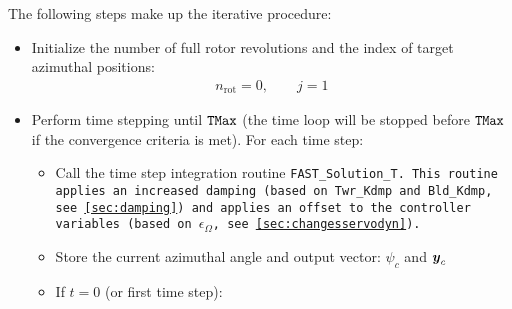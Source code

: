 \documentclass[11pt]{article}
\begin{document}
The following steps make up the iterative procedure:
\begin{itemize}\tightlist
    \item Initialize the number of full rotor revolutions and the index of target azimuthal positions:
        \begin{align}
            n_\text{rot} = 0
         , \qquad
         j = 1
        \end{align}
    \item Perform time stepping until $\tt{TMax}$ (the time loop will be stopped before $\tt{TMax}$ if the convergence criteria is met).
      For each time step:
        \begin{itemize}\tightlist
            \item Call the time step integration routine \tt{FAST\_Solution\_T}. This routine applies an increased damping (based on \tt{Twr\_Kdmp} and \tt{Bld\_Kdmp}, see \autoref{sec:damping}) and applies an offset to the controller variables (based on $\epsilon_\Omega$, see \autoref{sec:changesservodyn}).
            \item Store the current azimuthal angle and output vector: $\psi_{c}$ and $\v{y}_c$
            \item If $t=0$ (or first time step):
                \begin{itemize}\tightlist

\end{itemize}
\end{itemize}
\end{itemize}
\end{document}
